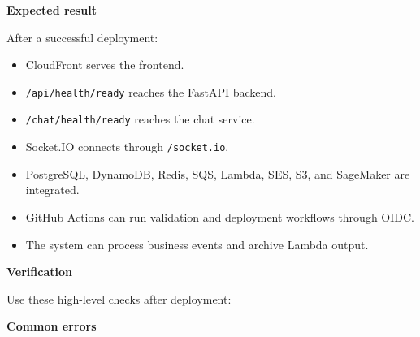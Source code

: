 \vspace{0.5em}\noindent\textbf{Expected result}\par

After a successful deployment:

\begin{itemize}
\tightlist
\item
  CloudFront serves the frontend.
\item
  \texttt{/\allowbreak{}api/\allowbreak{}health/\allowbreak{}ready} reaches the FastAPI backend.
\item
  \texttt{/\allowbreak{}chat/\allowbreak{}health/\allowbreak{}ready} reaches the chat service.
\item
  Socket.IO connects through \texttt{/\allowbreak{}socket.\allowbreak{}io}.
\item
  PostgreSQL, DynamoDB, Redis, SQS, Lambda, SES, S3, and SageMaker are
  integrated.
\item
  GitHub Actions can run validation and deployment workflows through
  OIDC.
\item
  The system can process business events and archive Lambda output.
\end{itemize}

\vspace{0.5em}\noindent\textbf{Verification}\par

Use these high-level checks after deployment:

\begin{Shaded}
\begin{Highlighting}[]
 
 
 
\end{Highlighting}
\end{Shaded}

\vspace{0.5em}\noindent\textbf{Common errors}\par


